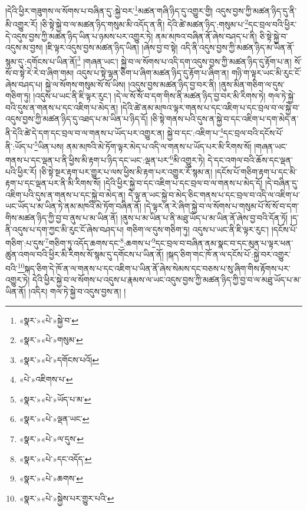 །དེའི་ཕྱིར་གཟུགས་ལ་སོགས་པ་བཞིན་དུ་:སྐྱེ་བར་\footnote{«སྣར་»«པེ་»སྐྱེ་བ་}མཚན་གཞི་ཉིད་དུ་འགྱུར་གྱི། འདུས་བྱས་ཀྱི་མཚན་ཉིད་དུ་ནི་མི་འགྱུར་རོ། །ཅི་སྟེ་སྐྱེ་བ་ལ་མཚན་ཉིད་གསུམ་མི་འདོད་ན་ནི། དེའི་ཚེ་མཚན་ཉིད་:གསུམ་པ་\footnote{«སྣར་»«པེ་»གསུམ་}དང་བྲལ་བའི་ཕྱིར་དེ་འདུས་བྱས་ཀྱི་མཚན་ཉིད་ཡིན་པ་ཉམས་པར་འགྱུར་ཏེ། ནམ་མཁའ་བཞིན་ནོ་ཞེས་བཤད་པ་ནི། ཅི་སྟེ་སྐྱེ་བ་འདུས་མ་བྱས། །ཇི་ལྟར་འདུས་བྱས་མཚན་ཉིད་ཡིན། །ཞེས་བྱ་བ་སྟེ། འདི་ནི་འདུས་བྱས་ཀྱི་མཚན་ཉིད་མ་ཡིན་ནོ་སྙམ་དུ་:དགོངས་པ་ཡིན་ནོ།\footnote{«སྣར་»«པེ་»དགོངས་པའོ།} །གཞན་ཡང་། སྐྱེ་བ་ལ་སོགས་པ་འདི་དག་འདུས་བྱས་ཀྱི་མཚན་ཉིད་དུ་རྟོག་པ་ན། སོ་སོ་བ་སྟེ་རེ་རེ་བ་ཞིག་གམ། འདུས་པ་སྟེ་ལྷན་ཅིག་པ་ཞིག་མཚན་ཉིད་དུ་རྟོག་པ་ཞིག་ན། གཉི་ག་ལྟར་ཡང་མི་རུང་ངོ་ཞེས་བཤད་པ། སྐྱེ་ལ་སོགས་གསུམ་སོ་སོ་ཡིས། །འདུས་བྱས་མཚན་ཉིད་བྱ་བར་ནི། །ནུས་མིན་གཅིག་ལ་དུས་གཅིག་ཏུ། །འདུས་པ་ཡང་ནི་ཇི་ལྟར་རུང་། །དེ་ལ་སོ་སོ་བ་དག་གིས་ནི་མཚན་ཉིད་བྱ་བར་མི་རིགས་ཏེ། གལ་ཏེ་སྐྱེ་བའི་དུས་ན་གནས་པ་དང་འཇིག་པ་མེད་ན། །དེའི་ཚེ་ནམ་མཁའ་ལྟར་གནས་པ་དང་འཇིག་པ་དང་བྲལ་བ་ལ་སྐྱེ་བ་འདུས་བྱས་ཀྱི་མཚན་ཉིད་དུ་འཐད་པ་མ་ཡིན་པ་ཉིད་དོ། །ཅི་སྟེ་གནས་པའི་དུས་ན་སྐྱེ་བ་དང་འཇིག་པ་དག་མེད་ན་ནི་དེའི་ཚེ་དེ་དག་དང་བྲལ་བ་ལ་གནས་པ་ཡོད་པར་འགྱུར་ན། སྐྱེ་བ་དང་:འཇིག་པ་\footnote{«པེ་»འཇིགས་པ་}དང་བྲལ་བའི་དངོས་པོ་ནི་:ཡོད་པ་\footnote{«སྣར་»«པེ་»ཡོད་པ་མ་}ཡིན་པས། ནམ་མཁའི་མེ་ཏོག་ལྟར་མེད་པ་འདི་ལ་གནས་པ་ཡོད་པར་མི་རིགས་སོ། །གཞན་ཡང་གནས་པ་དང་ལྡན་པ་ནི་ཕྱིས་མི་རྟག་པ་ཉིད་དང་ཡང་:ལྡན་པར་\footnote{«སྣར་»«པེ་»ལྡན་ཡང་}མི་འགྱུར་ཏེ། དེ་དང་འགལ་བའི་ཆོས་དང་ལྡན་པའི་ཕྱིར་རོ། །ཅི་སྟེ་སྔར་རྟག་པར་གྱུར་པ་ལས་ཕྱིས་མི་རྟག་པར་འགྱུར་རོ་སྙམ་ན། །དངོས་པོ་གཅིག་རྟག་པ་དང་མི་རྟག་པ་དང་ལྡན་པར་ནི་མི་རིགས་སོ། །དེའི་ཕྱིར་སྐྱེ་བ་དང་འཇིག་པ་དང་བྲལ་བ་ལ་གནས་པ་མེད་དོ། །དེ་བཞིན་དུ་འཇིག་པའི་དུས་ན་གནས་པ་དང་སྐྱེ་བ་མེད་ན། དེ་ལྟ་ན་ཡང་སྐྱེ་བ་མེད་ཅིང་གནས་པ་དང་བྲལ་བ་འདི་ལ་འཇིག་པ་ཡང་ཡོད་པ་མ་ཡིན་ཏེ་ནམ་མཁའི་མེ་ཏོག་བཞིན་ནོ། །དེ་ལྟར་ན་རེ་ཞིག་སྐྱེ་བ་ལ་སོགས་པ་གསུམ་པོ་སོ་སོ་བ་དག་གིས་མཚན་ཉིད་ཀྱི་བྱ་བ་ནུས་པ་མ་ཡིན་ནོ། །ནུས་པ་མ་ཡིན་པ་ནི་མཐུ་ཡོད་པ་མ་ཡིན་ནོ་ཞེས་བྱ་བའི་དོན་ཏོ། །ད་ནི་འདུས་པ་དག་ཀྱང་མི་རུང་ངོ་ཞེས་བཤད་པ། གཅིག་ལ་དུས་གཅིག་ཏུ། འདུས་པ་ཡང་ནི་ཇི་ལྟར་རུང་། །དངོས་པོ་གཅིག་:པ་དུས་\footnote{«སྣར་»«པེ་»ལ་དུས་}གཅིག་ཏུ་འདོད་ཆགས་དང་\footnote{«སྣར་»«པེ་»དང་འདོད་}:ཆགས་པ་\footnote{«སྣར་»«པེ་»ཆགས་}དང་བྲལ་བ་བཞིན་ནམ་སྣང་བ་དང་མུན་པ་ལྟར་ཕན་ཚུན་འགལ་བའི་ཕྱིར་མི་རིགས་སོ་སྙམ་དུ་དགོངས་པ་ཡིན་ནོ། །སྐད་ཅིག་གང་ཁོ་ན་ལ་དངོས་པོ་:སྐྱེ་བར་འགྱུར་བའི་\footnote{«སྣར་»«པེ་»སྐྱེས་པར་གྱུར་པའི་}སྐད་ཅིག་དེ་ཁོ་ན་ལ་གནས་པ་དང་འཇིག་པ་ཡིན་ནོ་ཞེས་སེམས་དང་བཅས་པ་སུ་ཞིག་གིས་རྟོགས་པར་འགྱུར་ཏེ། དེའི་ཕྱིར་སྐྱེ་བ་ལ་སོགས་པ་འདུས་པ་རྣམས་ལ་ཡང་འདུས་བྱས་ཀྱི་མཚན་ཉིད་ཀྱི་བྱ་བ་ལ་མཐུ་ཡོད་པ་མ་ཡིན་ནོ། །འདིར། གལ་ཏེ་སྐྱེ་བ་འདུས་བྱས་ན། །
